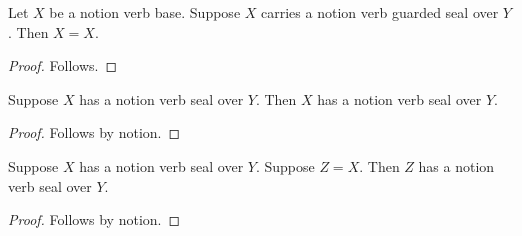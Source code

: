 \begin{proposition}\label{notion_verb_formation}
    Let $X$ be a notion verb base.
    Suppose $X$ carries a notion verb guarded seal over $Y$.
    Then $X=X$.
\end{proposition}
\begin{proof}
    Follows.
\end{proof}

\begin{proposition}\label{notion_verb_by_notion}
    Suppose $X$ has a notion verb seal over $Y$.
    Then $X$ has a notion verb seal over $Y$.
\end{proposition}
\begin{proof}
    Follows by notion.
\end{proof}

\begin{proposition}\label{notion_verb_equality_transport}
    Suppose $X$ has a notion verb seal over $Y$.
    Suppose $Z=X$.
    Then $Z$ has a notion verb seal over $Y$.
\end{proposition}
\begin{proof}
    Follows by notion.
\end{proof}
